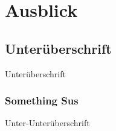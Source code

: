 
\chapter{Ausblick}\label{ch:ausblick}

\section{Unterüberschrift}
    Unterüberschrift

    \subsection{Something Sus} %
        Unter-Unterüberschrift